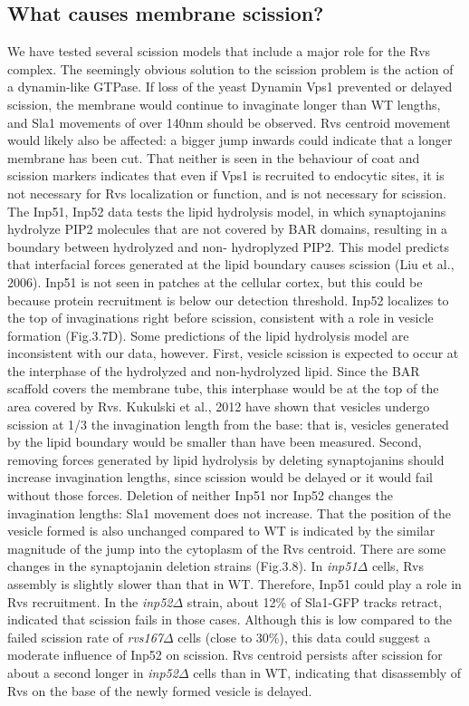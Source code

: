 \documentclass[9pt,lineno]{elife}
\begin{document}
\subsection{What causes membrane scission?}
 We have tested several scission models that include a major role for the Rvs complex. The seemingly obvious solution to the scission problem is the action of a dynamin-like GTPase. If loss of the yeast Dynamin Vps1 prevented or delayed scission, the membrane would continue to invaginate longer than WT lengths, and Sla1 movements of over 140nm should be observed. Rvs centroid movement would likely also be affected: a bigger jump inwards could indicate that a longer membrane has been cut. That neither is seen in the behaviour of coat and scission markers indicates that even if Vps1 is recruited to endocytic sites, it is not necessary for Rvs localization or function, and is not necessary for scission. The Inp51, Inp52 data tests the lipid hydrolysis model, in which synaptojanins hydrolyze PIP2 molecules that are not covered by BAR domains, resulting in a boundary between hydrolyzed and non- hydroplyzed PIP2. This model predicts that interfacial forces generated at the lipid boundary causes scission (Liu et al., 2006). Inp51 is not seen in patches at the cellular cortex, but this could be because protein recruitment is below our detection threshold. Inp52 localizes to the top of invaginations right before scission, consistent with a role in vesicle formation (Fig.3.7D). Some predictions of the lipid hydrolysis model are inconsistent with our data, however.
First, vesicle scission is expected to occur at the interphase of the hydrolyzed and non-hydrolyzed lipid. Since the BAR scaffold covers the membrane tube, this interphase would be at the top of the area covered by Rvs. Kukulski et al., 2012 have shown that vesicles undergo scission at 1/3 the invagination length from the base: that is, vesicles generated by the lipid boundary would be smaller than have been measured. Second, removing forces generated by lipid hydrolysis by deleting synaptojanins should increase invagination lengths, since scission would be delayed or it would fail without those forces. Deletion of neither Inp51 nor Inp52 changes the invagination lengths: Sla1 movement does not increase. That the position of the vesicle formed is also unchanged compared to WT is indicated by the similar magnitude of the jump into the cytoplasm of the Rvs centroid.
There are some changes in the synaptojanin deletion strains (Fig.3.8). In \textit{inp51$\Delta$} cells, Rvs assembly is slightly slower than that in WT. Therefore, Inp51 could play a role in Rvs recruitment. In the \textit{inp52$\Delta$} strain, about 12\% of Sla1-GFP tracks retract, indicated that scission fails in those cases. Although this is low compared to the failed scission rate of \textit{rvs167$\Delta$}  cells (close to 30\%), this data could suggest a moderate influence of Inp52 on scission. Rvs centroid persists after scission for about a second longer in \textit{inp52$\Delta$}  cells than in WT, indicating that disassembly of Rvs on the base of the newly formed vesicle is delayed.
\end{document}
